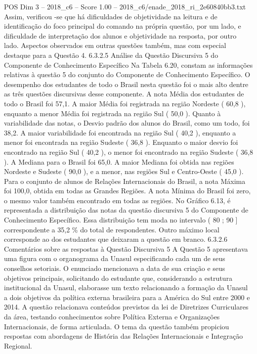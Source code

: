 \begin{textsample}{POS Dim 3 – 2018\_c6 – Score 1.00 – 2018\_c6/enade\_2018\_ri\_2e60840bb3.txt}
Assim, verificou -se que há dificuldades de objetividade na leitura e de identificação do foco principal do comando na própria questão, por um lado, e dificuldade de interpretação dos alunos e objetividade na resposta, por outro lado.
Aspectos observados em outras questões também, mas com especial destaque para a Questão 4. 6.3.2.5 Análise da Questão Discursiva 5 do Componente de Conhecimento Específico Na Tabela 6.20, constam as informações relativas à questão 5 do conjunto do Componente de Conhecimento Específico.
O desempenho dos estudantes de todo o Brasil nesta questão foi o mais alto dentre as três questões discursivas desse componente.
A nota Média dos estudantes de todo o Brasil foi 57,1.
A maior Média foi registrada na região Nordeste ( 60,8 ), enquanto a menor Média foi registrada na região Sul ( 50,0 ).
Quanto à variabilidade das notas, o Desvio padrão dos alunos do Brasil, como um todo, foi 38,2.
A maior variabilidade foi encontrada na região Sul ( 40,2 ), enquanto a menor foi encontrada na região Sudeste ( 36,8 ).
Enquanto o maior desvio foi encontrado na região Sul ( 40,2 ), o menor foi encontrado na região Sudeste ( 36,8 ).
A Mediana para o Brasil foi 65,0.
A maior Mediana foi obtida nas regiões Nordeste e Sudeste ( 90,0 ), e a menor, nas regiões Sul e Centro-Oeste ( 45,0 ).
Para o conjunto de alunos de Relações Internacionais do Brasil, a nota Máxima foi 100,0, obtida em todas as Grandes Regiões.
A nota Mínima do Brasil foi zero, o mesmo valor também encontrado em todas as regiões.
No Gráfico 6.13, é representada a distribuição das notas da questão discursiva 5 do Componente de Conhecimento Específico.
Essa distribuição tem moda no intervalo ( 80 ; 90 ] correspondente a 35,2 \% do total de respondentes.
Outro máximo local corresponde ao dos estudantes que deixaram a questão em branco. 6.3.2.6 Comentários sobre as respostas à Questão Discursiva 5 A Questão 5 apresentava uma figura com o organograma da Unasul especificando cada um de seus conselhos setoriais.
O enunciado mencionava a data de sua criação e seus objetivos principais, solicitando do estudante que, considerando a estrutura institucional da Unasul, elaborasse um texto relacionando a formação da Unasul a dois objetivos da política externa brasileira para a América do Sul entre 2000 e 2014.
A questão relacionava conteúdos previstos da lei de Diretrizes Curriculares da área, testando conhecimentos sobre Política Externa e Organizações Internacionais, de forma articulada.
O tema da questão também propiciou respostas com abordagens de História das Relações Internacionais e Integração Regional.

\end{textsample}
